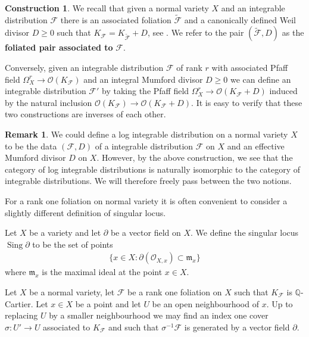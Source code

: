 \documentclass[12pt, a4paper]{amsart}
\DeclareMathOperator{\sing}{Sing}
\theoremstyle{definition}
\newtheorem{construction}[theorem]{Construction}
\newtheorem{remark}[theorem]{Remark}
\theoremstyle{named}
\begin{document}
\begin{construction}
\label{fol_to_dist}
We recall that given a normal variety $X$ and an integrable distribution $\mathcal F$
there is an associated foliation $\tilde{\mathcal F}$ and a canonically defined Weil divisor $D \ge 0$ such that $K_{\mathcal F} = K_{\tilde{\mathcal F}}+D$, see \cite[Lemma 2.2]{CS23b}.  We refer to the
pair $(\tilde{\mathcal F}, D)$ as the {\bf foliated pair associated to} $\mathcal F$.

Conversely, given an integrable distribution $\mathcal F$ of rank $r$ 
with associated Pfaff field $\Omega^r_X \rightarrow \mathcal O(K_{\mathcal F})$
and an integral Mumford divisor $D \ge 0$
we can define an integrable distribution $\mathcal F'$ by taking the Pfaff field
$\Omega^r_X \rightarrow \mathcal O(K_{\mathcal F}+D)$ induced by the natural inclusion
$\mathcal O(K_{\mathcal F}) \rightarrow \mathcal O(K_{\mathcal F}+D)$.  It is easy to verify that these two constructions are inverses of each other.
\end{construction}




\begin{remark}
\label{rmk_log_dist_is_dist}
We could define a log integrable distribution on a normal variety 
$X$ 
to be the data
$(\mathcal F, D)$
of a integrable distribution
$\mathcal F$ on $X$ and an effective Mumford divisor $D$ on $X$.
However, by the above construction, we see that the category of log integrable distributions is naturally isomorphic to the category of integrable distributions.  We will therefore freely pass between the two notions.
\end{remark}


For a rank one foliation on normal variety it is often convenient to consider a slightly different definition of singular locus. 


Let $X$ be a variety and let $\partial$ 
be a vector field on $X$.  We define the singular locus $\sing \partial$
to be the set of points 
\begin{align*}\{x \in X: \partial(\mathcal O_{X, x}) \subset \mathfrak m_x\}\end{align*}
where $\mathfrak m_x$ is the maximal ideal at the point $x \in X$.

Let $X$ be a normal variety, let $\mathcal F$ be a rank one foliation on $X$ such that 
$K_{\mathcal F}$ is $\mathbb Q$-Cartier.  Let $x \in X$ be a point and let $U$ be an open neighbourhood of $x$.  
Up to replacing $U$ by a smaller neighbourhood we may find an index one cover $\sigma\colon U' \rightarrow U$ associated to $K_{\mathcal F}$
and such that $\sigma^{-1}\mathcal F$ is generated by a vector field $\partial$.
\end{document}
